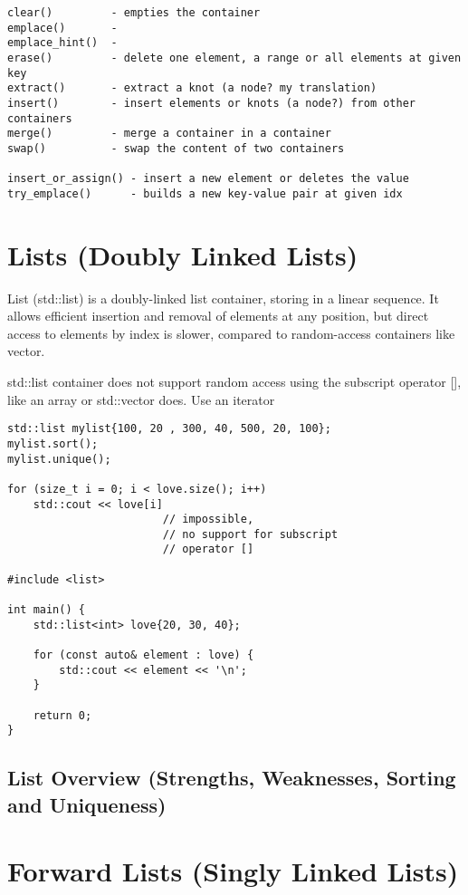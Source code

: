 \begin{verbatim}
clear()         - empties the container
emplace()       -    
emplace_hint()  -  
erase()         - delete one element, a range or all elements at given key
extract()       - extract a knot (a node? my translation)
insert()        - insert elements or knots (a node?) from other containers
merge()         - merge a container in a container 
swap()          - swap the content of two containers 

insert_or_assign() - insert a new element or deletes the value
try_emplace()      - builds a new key-value pair at given idx
\end{verbatim}

\section{Lists (Doubly Linked Lists)}

List (std::list) is a doubly-linked list container, storing in a linear sequence. 
It allows efficient insertion and removal of elements at any position, 
but direct access to elements by index is slower,
compared to random-access containers like vector.

std::list container does not support random access using the subscript operator [],
like an array or std::vector does. Use an iterator

\begin{verbatim}
std::list mylist{100, 20 , 300, 40, 500, 20, 100};
mylist.sort();
mylist.unique();

for (size_t i = 0; i < love.size(); i++)
    std::cout << love[i] 
                        // impossible, 
                        // no support for subscript
                        // operator []

#include <list>

int main() {
    std::list<int> love{20, 30, 40};

    for (const auto& element : love) {
        std::cout << element << '\n';
    }

    return 0;
}
\end{verbatim}

\subsection{List Overview (Strengths, Weaknesses, Sorting and Uniqueness)}

\section{Forward Lists (Singly Linked Lists)}

